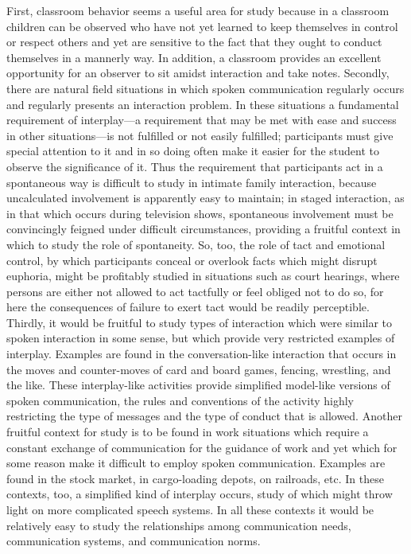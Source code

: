 \documentclass[twoside,symmetric,nobib,justified]{tufte-book}
\begin{document}
First, classroom behavior seems a useful area for study because in a
classroom children can be observed who have not yet learned to keep
themselves in control or respect others and yet are sensitive to the
fact that they ought to conduct themselves in a mannerly way. In
addition, a classroom provides an excellent opportunity for an observer
to sit amidst interaction and take notes. Secondly, there are natural
field situations in which spoken communication regularly occurs and
regularly presents an interaction problem. In these situations a
fundamental requirement of interplay---a requirement that may be met
with ease and success in other situations---is not fulfilled or not
easily fulfilled; participants must give special attention to it and in
so doing often make it easier for the student to observe the
significance of it. Thus the requirement that participants act in a
spontaneous way is difficult to study in intimate family interaction,
because uncalculated involvement is apparently easy to maintain; in
staged interaction, as in that which occurs during television shows,
spontaneous involvement must be convincingly feigned under difficult
circumstances, providing a fruitful context in which to study the role
of spontaneity. So, too, the role of tact and emotional control, by
which participants conceal or overlook facts which might disrupt
euphoria, might be profitably studied in situations such as court
hearings, where persons are either not allowed to act tactfully or feel
obliged not to do so, for here the consequences of failure to exert tact
would be readily perceptible. Thirdly, it would be fruitful to study
types of interaction which were similar to spoken interaction in some
sense, but which provide very restricted examples of interplay. Examples
are found in the conversation-like interaction that occurs in the moves
and counter-moves of card and board games, fencing, wrestling, and the
like. These interplay-like activities provide simplified model-like
versions of spoken communication, the rules and conventions of the
activity highly restricting the type of messages and the type of conduct
that is allowed. Another fruitful context for study is to be found in
work situations which require a constant exchange of communication for
the guidance of work and yet which for some reason make it difficult to
employ spoken communication. Examples are found in the stock market, in
cargo-loading depots, on railroads, etc. In these contexts, too, a
simplified kind of interplay occurs, study of which might throw light on
more complicated speech systems. In all these contexts it would be
relatively easy to study the relationships among communication needs,
communication systems, and communication norms.
\end{document}
